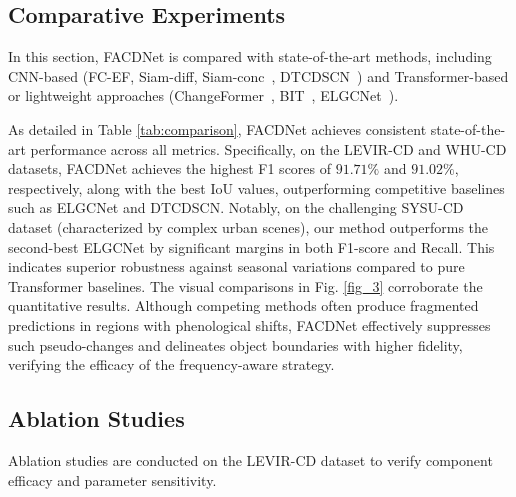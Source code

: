 \documentclass[lettersize,journal]{IEEEtran}
\begin{document}
\vspace{-10pt}
\subsection{Comparative Experiments}
In this section, FACDNet is compared with state-of-the-art methods, including CNN-based (FC-EF, Siam-diff, Siam-conc~\cite{daudt2018fully}, DTCDSCN~\cite{liu2020building}) and Transformer-based or lightweight approaches (ChangeFormer~\cite{bandara2022transformer}, BIT~\cite{chen2021remote}, ELGCNet~\cite{noman2024elgc}).

As detailed in Table \ref{tab:comparison}, FACDNet achieves consistent state-of-the-art performance across all metrics. Specifically, on the LEVIR-CD and WHU-CD datasets, FACDNet achieves the highest F1 scores of $91.71\%$ and $91.02\%$, respectively, along with the best IoU values, outperforming competitive baselines such as ELGCNet and DTCDSCN. Notably, on the challenging SYSU-CD dataset (characterized by complex urban scenes), our method outperforms the second-best ELGCNet by significant margins in both F1-score and Recall. This indicates superior robustness against seasonal variations compared to pure Transformer baselines.
The visual comparisons in Fig. \ref{fig_3} corroborate the quantitative results. Although competing methods often produce fragmented predictions in regions with phenological shifts, FACDNet effectively suppresses such pseudo-changes and delineates object boundaries with higher fidelity, verifying the efficacy of the frequency-aware strategy.

\vspace{-10pt}

\subsection{Ablation Studies}
Ablation studies are conducted on the LEVIR-CD dataset to verify component efficacy and parameter sensitivity.

\vspace{-5pt}
\end{document}
